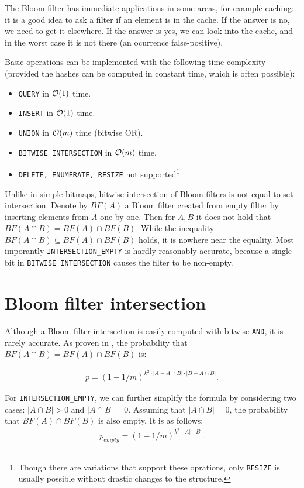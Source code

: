 The Bloom filter has immediate applications in some areas, for example caching:
it is a good idea to ask a filter if an element is in the cache. If the answer is
no, we need to get it elsewhere. If the answer is yes, we can look into the
cache, and in the worst case it is not there (an ocurrence false-positive).

Basic operations can be implemented with the following time complexity (provided
the hashes can be computed in constant time, which is often possible):

\begin{itemize}
	\item {\tt QUERY} in $\mathcal{O}(1)$ time.
	\item {\tt INSERT} in $\mathcal{O}(1)$ time.
	\item {\tt UNION} in $\mathcal{O}(m)$ time (bitwise OR).
	\item {\tt BITWISE\_INTERSECTION} in $\mathcal{O}(m)$ time.
	\item {\tt DELETE, ENUMERATE, RESIZE} not supported\footnote{Though there
		are variations that support these oprations, only {\tt RESIZE} is usually
		possible without drastic changes to the structure.}.
\end{itemize}

Unlike in simple bitmaps, bitwise intersection of Bloom filters is not equal to
set intersection.  Denote by $BF(A)$ a Bloom filter created from empty
filter by inserting elements from $A$ one by one. Then for $A,B$ it does not
hold that $BF(A \cap B) = BF(A) \cap BF(B)$. While the inequality $BF(A \cap B)
\subseteq BF(A) \cap BF(B)$ holds, it is nowhere near the equality. Most
imporantly {\tt INTERSECTION\_EMPTY} is hardly reasonably accurate, because a
single bit in {\tt BITWISE\_INTERSECTION} causes the filter to be non-empty. 

\section{Bloom filter intersection}

Although a Bloom filter intersection is easily computed with bitwise {\tt AND},
it is rarely accurate. As proven in \cite{bose2008false}, the probability that
$BF(A\cap B) = BF(A) \cap BF(B)$ is:

\begin{align*}
	p = (1-1/m)^{k^2\cdot |A-A\cap B| \cdot |B - A\cap B|} \mathrm{.}
\end{align*}

\noindent For {\tt INTERSECTION\_EMPTY}, we can further simplify the formula by
considering two cases: $|A \cap B| > 0$ and $|A \cap B| = 0$. Assuming that
$|A\cap B| = 0$, the probability that $BF(A) \cap BF(B)$ is also empty. It is as
follows:
\begin{align*}
	p_{empty} = (1-1/m)^{k^2 \cdot |A| \cdot |B|} \mathrm{.}
\end{align*}

